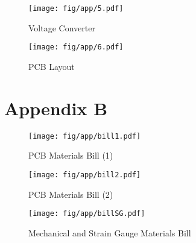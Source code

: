 \begin{figure}[h]
	\begin{center}
	\texttt{[image: fig/app/5.pdf]}
	\end{center}
	\vspace{-4mm}
	\caption[Voltage Converter]
	{Voltage Converter}
	\label{fig:app5}
	\vspace{-2mm}
\end{figure}

\begin{figure}[h]
	\begin{center}
	\texttt{[image: fig/app/6.pdf]}
	\end{center}
	\vspace{-4mm}
	\caption[PCB Layout]
	{PCB Layout}
	\label{fig:app6}
	\vspace{-2mm}
\end{figure}
%

\chapter*{Appendix B}
\label{AppendixB} %

\begin{figure}[h]
	\begin{center}
	\texttt{[image: fig/app/bill1.pdf]}
	\end{center}
	\vspace{-4mm}
	\caption[PCB Materials Bill (1)]
	{PCB Materials Bill (1)}
	\label{fig:billPCB1}
	\vspace{-2mm}
\end{figure}

\begin{figure}[h]
	\begin{center}
	\texttt{[image: fig/app/bill2.pdf]}
	\end{center}
	\vspace{-4mm}
	\caption[PCB Materials Bill (2)]
	{PCB Materials Bill (2)}
	\label{fig:billPCB2}
	\vspace{-2mm}
\end{figure}

\begin{figure}[h]
	\begin{center}
	\texttt{[image: fig/app/billSG.pdf]}
	\end{center}
	\vspace{-4mm}
	\caption[Mechanical and Strain Gauge Materials Bill]
	{Mechanical and Strain Gauge Materials Bill}
	\label{fig:billSG}
	\vspace{-2mm}
\end{figure}